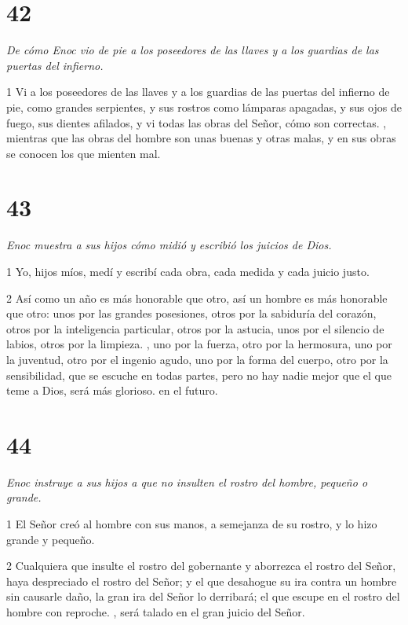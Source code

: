 \chapter{42}

\par \textit{De cómo Enoc vio de pie a los poseedores de las llaves y a los guardias de las puertas del infierno.}

\par 1 Vi a los poseedores de las llaves y a los guardias de las puertas del infierno de pie, como grandes serpientes, y sus rostros como lámparas apagadas, y sus ojos de fuego, sus dientes afilados, y vi todas las obras del Señor, cómo son correctas. , mientras que las obras del hombre son unas buenas y otras malas, y en sus obras se conocen los que mienten mal.

\chapter{43}

\par \textit{Enoc muestra a sus hijos cómo midió y escribió los juicios de Dios.}

\par 1 Yo, hijos míos, medí y escribí cada obra, cada medida y cada juicio justo.

\par 2 Así como un año es más honorable que otro, así un hombre es más honorable que otro: unos por las grandes posesiones, otros por la sabiduría del corazón, otros por la inteligencia particular, otros por la astucia, unos por el silencio de labios, otros por la limpieza. , uno por la fuerza, otro por la hermosura, uno por la juventud, otro por el ingenio agudo, uno por la forma del cuerpo, otro por la sensibilidad, que se escuche en todas partes, pero no hay nadie mejor que el que teme a Dios, será más glorioso. en el futuro.

\chapter{44}

\par \textit{Enoc instruye a sus hijos a que no insulten el rostro del hombre, pequeño o grande.}

\par 1 El Señor creó al hombre con sus manos, a semejanza de su rostro, y lo hizo grande y pequeño.

\par 2 Cualquiera que insulte el rostro del gobernante y aborrezca el rostro del Señor, haya despreciado el rostro del Señor; y el que desahogue su ira contra un hombre sin causarle daño, la gran ira del Señor lo derribará; el que escupe en el rostro del hombre con reproche. , será talado en el gran juicio del Señor.

